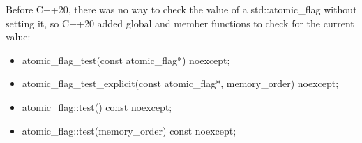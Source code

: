 Before C++20, there was no way to check the value of a std::atomic\_flag without setting it, so C++20 added global and member functions to check for the current value:

\begin{itemize}
\item 
atomic\_flag\_test(const atomic\_flag*) noexcept;

\item 
atomic\_flag\_test\_explicit(const atomic\_flag*, memory\_order) noexcept;

\item 
atomic\_flag::test() const noexcept;

\item 
atomic\_flag::test(memory\_order) const noexcept;
\end{itemize}